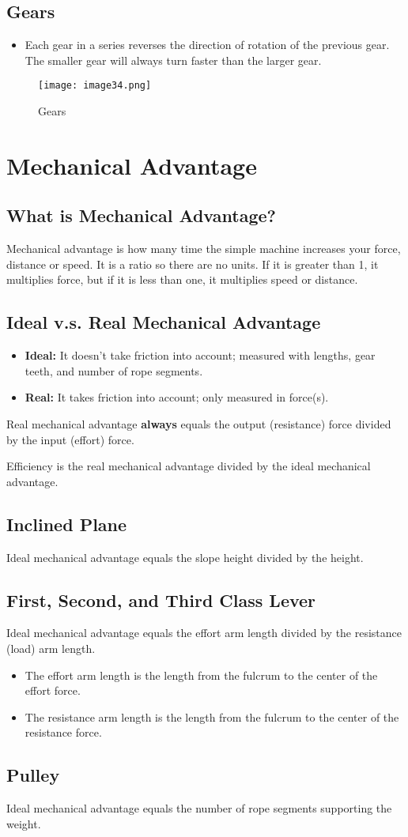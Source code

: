 \documentclass{article}
\begin{document}
\subsection{Gears}
\begin{itemize}
    \item Each gear in a series reverses the direction of rotation of the previous gear. The smaller gear will always turn faster than the larger gear. 
\end{itemize}
\begin{figure}
    \centering
    \texttt{[image: image34.png]}
    \caption{Gears}
\end{figure}
\section{Mechanical Advantage}
\subsection{What is Mechanical Advantage?}
Mechanical advantage is how many time the simple machine increases your force, distance or speed. It is a ratio so there are no units. If it is greater than 1, it multiplies force, but if it is less than one, it multiplies speed or distance. 

\subsection{Ideal v.s. Real Mechanical Advantage}
\begin{itemize}
    \item \textbf{Ideal:} It doesn't take friction into account; measured with lengths, gear teeth, and number of rope segments.
    \item \textbf{Real:} It takes friction into account; only measured in force(s). 
\end{itemize}
\noindent Real mechanical advantage \textbf{always} equals the output (resistance) force divided by the input (effort) force.

\bigskip \noindent Efficiency is the real mechanical advantage divided by the ideal mechanical advantage.

\subsection{Inclined Plane}
Ideal mechanical advantage equals the slope height divided by the height.

\subsection{First, Second, and Third Class Lever}
Ideal mechanical advantage equals the effort arm length divided by the resistance (load) arm length.
\begin{itemize}
    \item The effort arm length is the length from the fulcrum to the center of the effort force.
    \item The resistance arm length is the length from the fulcrum to the center of the resistance force.
\end{itemize}
\subsection{Pulley}
Ideal mechanical advantage equals the number of rope segments supporting the weight.
\end{document}
